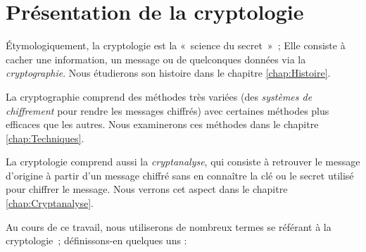 \section{Présentation de la cryptologie}
Étymologiquement, la cryptologie est la «~science du secret~»~;
Elle consiste à cacher une
information, un message ou de quelconques données via la
\emph{cryptographie}. Nous étudierons son histoire
dans le chapitre \ref{chap:Histoire}.

La cryptographie comprend des méthodes très variées (des
\emph{systèmes de chiffrement} pour rendre les messages chiffrés)
avec certaines méthodes plus efficaces que les autres.
Nous examinerons ces méthodes dans le chapitre
\ref{chap:Techniques}.

La cryptologie comprend aussi la \emph{cryptanalyse}, qui consiste à
retrouver le message d'origine à partir d'un message chiffré sans en
connaître la clé ou le secret utilisé pour chiffrer le message.
Nous verrons cet aspect dans le chapitre \ref{chap:Cryptanalyse}.

Au cours de ce travail, nous utiliserons de nombreux termes se référant à
la cryptologie~; définissons-en quelques uns : 


